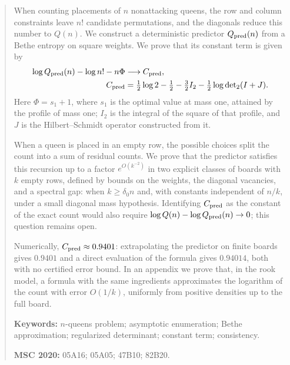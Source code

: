 \begin{abstract}
\noindent When counting placements of $n$ nonattacking queens, the row and column constraints leave
$n!$ candidate permutations, and the diagonals reduce this number to $Q(n)$.
We construct a deterministic predictor $Q_{\rm pred}(n)$ from a Bethe entropy on square weights.
We prove that its constant term is given by
\[
\begin{aligned}
 \log Q_{\rm pred}(n)-\log n!-n\Phi &\longrightarrow C_{\rm pred},\\
 C_{\rm pred} &=\tfrac12\log2-\tfrac12-\tfrac32I_2-\tfrac12\log{\det}_2(I+J).
\end{aligned}
\]
Here $\Phi=s_1+1$, where $s_1$ is the optimal value at mass one, attained by the profile of mass one;
$I_2$ is the integral of the square of that profile, and $J$ is the Hilbert--Schmidt operator constructed
from it.

\smallskip\noindent When a queen is placed in an empty row, the possible choices split the count
into a sum of residual counts. We prove that the predictor satisfies this recursion up to a factor
$e^{O(k^{-2})}$ in two explicit classes of boards with $k$ empty rows, defined by bounds on the weights,
the diagonal vacancies, and a spectral gap: when $k\ge\delta_0 n$ and, with constants independent of $n/k$,
under a small diagonal mass hypothesis.
Identifying $C_{\rm pred}$ as the constant of the exact count would also require $\log Q(n)-\log Q_{\rm
pred}(n)\to0$; this question remains open.

\smallskip\noindent Numerically, $C_{\rm pred}\approx0.9401$: extrapolating the predictor on finite boards
gives $0.9401$ and a direct evaluation of the formula gives $0.94014$, both with no certified error bound.
In an appendix we prove that, in the rook model, a formula with the same ingredients approximates the
logarithm of the count with error $O(1/k)$, uniformly from positive densities up to the full board.

\medskip\noindent
\textbf{Keywords:} $n$-queens problem; asymptotic enumeration; Bethe approximation;
regularized determinant; constant term; consistency.

\noindent
\textbf{MSC 2020:} 05A16; 05A05; 47B10; 82B20.
\end{abstract}
